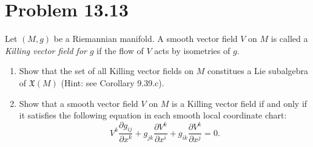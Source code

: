 \documentclass[11pt, letterpaper]{article}
\begin{document}
\section{Problem 13.13}
\begin{problem}
	Let $(M,g)$ be a Riemannian manifold. A smooth vector field $V$ on $M$ is called a \emph{Killing vector field for $g$} if the flow of $V$ acts by isometries of $g$.
	\begin{enumerate}
		\item Show that the set of all Killing vector fields on $M$ constitues a Lie subalgebra of $\mathfrak{X} (M)$ (Hint: see Corollary 9.39.c).
		\item Show that a smooth vector field $V$ on $M$ is a Killing vector field if and only if it satisfies the following equation in each smooth local coordinate chart:
			\[
				V^k \frac{\partial g_{ij} }{\partial x^k} +g_{jk} \frac{\partial V^k}{\partial x^i} +g_{ik} \frac{\partial V^k}{\partial x^j} =0
			.\]
	\end{enumerate}
\end{problem}
\end{document}
